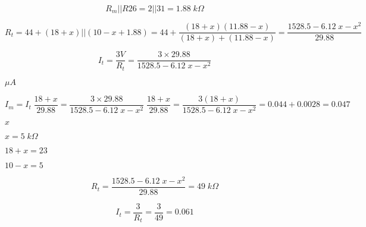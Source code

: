 {\newpage\clearpage
{}%
\begin{displaymath}
    R_m||R26=2||31=1.88\;k\Omega
    \end{displaymath}%
\lthtmldisplayZ
\lthtmlcheckvsize\clearpage}

{\newpage\clearpage
{}%
\begin{displaymath}
    R_t=44+(18+x)||(10-x+1.88)=44+\frac{(18+x)(11.88-x)}{(18+x)+(11.88-x)}
    =\frac{1528.5-6.12\;x-x^2}{29.88}
    \end{displaymath}%
\lthtmldisplayZ
\lthtmlcheckvsize\clearpage}

{\newpage\clearpage
{}%
\begin{displaymath}
    I_t=\frac{3V}{R_t}=\frac{3\times 29.88}{1528.5-6.12\;x-x^2}
    \end{displaymath}%
\lthtmldisplayZ
\lthtmlcheckvsize\clearpage}

{\newpage\clearpage
{}%
$\mu A$%
\lthtmlinlinemathZ
\lthtmlcheckvsize\clearpage}

{\newpage\clearpage
{}%
\begin{displaymath}
    I_m=I_t\;\frac{18+x}{29.88}
    =\frac{3\times 29.88}{1528.5-6.12\;x-x^2}\;\frac{18+x}{29.88}
    =\frac{3(18+x)}{1528.5-6.12\;x-x^2}=0.044+0.0028=0.047
    \end{displaymath}%
\lthtmldisplayZ
\lthtmlcheckvsize\clearpage}

{\newpage\clearpage
{}%
$x$%
\lthtmlinlinemathZ
\lthtmlcheckvsize\clearpage}

{\newpage\clearpage
{}%
$x=5\;k\Omega$%
\lthtmlinlinemathZ
\lthtmlcheckvsize\clearpage}

{\newpage\clearpage
{}%
$18+x=23$%
\lthtmlinlinemathZ
\lthtmlcheckvsize\clearpage}

{\newpage\clearpage
{}%
$10-x=5$%
\lthtmlinlinemathZ
\lthtmlcheckvsize\clearpage}

{\newpage\clearpage
{}%
\begin{displaymath}
    R_t=\frac{1528.5-6.12\;x-x^2}{29.88}=49\;k\Omega
    \end{displaymath}%
\lthtmldisplayZ
\lthtmlcheckvsize\clearpage}

{\newpage\clearpage
{}%
\begin{displaymath}
    I_t=\frac{3}{R_t}=\frac{3}{49}=0.061
    \end{displaymath}%
\lthtmldisplayZ
\lthtmlcheckvsize\clearpage}

